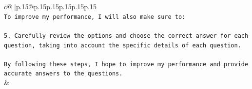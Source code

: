 \documentclass{article}
\begin{document}
{\begin{supertabular}{c@{$\;$}|p{.15\linewidth}@{}p{.15\linewidth}p{.15\linewidth}p{.15\linewidth}p{.15\linewidth}p{.15\linewidth}}
{{{\\ 
\texttt{To improve my performance, I will also make sure to:} \\
\\ 
\texttt{5. Carefully review the options and choose the correct answer for each question, taking into account the specific details of each question.} \\
\\ 
\texttt{By following these steps, I hope to improve my performance and provide accurate answers to the questions.} \\
            }
        }
    }
    & \\ \\

\end{supertabular}
}
\end{document}
